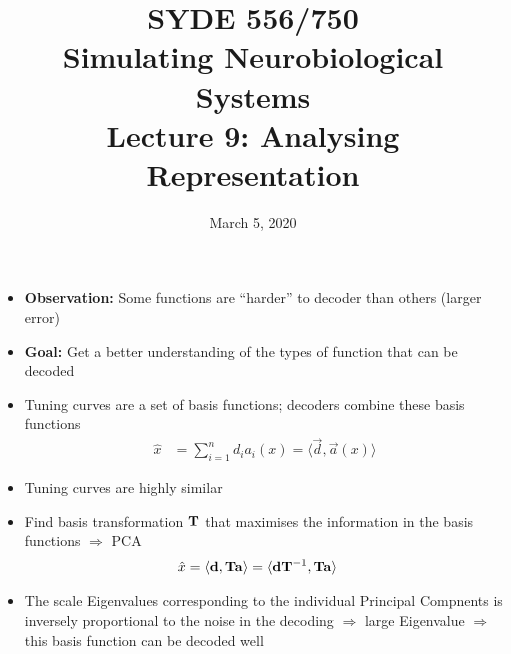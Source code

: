 \documentclass[10pt,letterpaper,oneside]{article}
\date{March 5, 2020}
\title{SYDE 556/750 \\ Simulating Neurobiological Systems \\ Lecture 9: Analysing Representation}
\begin{document}


\ConstructionSite

\begin{itemize}
	\item \textbf{Observation:} Some functions are \enquote{harder} to decoder than others (larger error)
	\item \textbf{Goal:} Get a better understanding of the types of function that can be decoded
	\item Tuning curves are a set of basis functions; decoders combine these basis functions
	\begin{align*}
		\hat x &= \sum_{i = 1}^n d_i a_i(x) = \langle \vec d, \vec a(x) \rangle
	\end{align*}
	\item Tuning curves are highly similar
	\item Find basis transformation ${\mathbf{T}}$ that maximises the information in the basis functions $\Rightarrow$ PCA
	\begin{align*}
		\hat x &= \langle {\mathbf{d}}, {\mathbf{T}} {\mathbf{a}} \rangle = \langle {\mathbf{d}} {\mathbf{T}}^{-1}, {\mathbf{T}} {\mathbf{a}} \rangle
	\end{align*}
	\item The scale Eigenvalues corresponding to the individual Principal Compnents is inversely proportional to the noise in the decoding $\Rightarrow$ large Eigenvalue $\Rightarrow$ this basis function can be decoded well
\end{itemize}

\printbibliography
\end{document}
